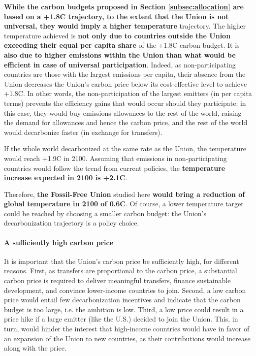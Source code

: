 \documentclass[12pt,english]{article}
\begin{document}
\textbf{While the carbon budgets proposed in Section \ref{subsec:allocation} are based on a +1.8\textdegree{}C trajectory, to the extent that the Union is not universal, they would imply a higher temperature} trajectory. The higher temperature achieved is \textbf{not only due to countries outside the Union exceeding their equal per capita share} of the +1.8\textdegree{}C carbon budget. It is \textbf{also due to higher emissions within the Union than what would be efficient in case of universal participation}. Indeed, as non-participating countries are those with the largest emissions per capita, their absence from the Union decreases the Union's carbon price below its cost-effective level to achieve +1.8\textdegree{}C. In other words, the non-participation of the largest emitters (in per capita terms) prevents the efficiency gains that would occur should they participate: in this case, they would buy emissions allowances to the rest of the world, raising the demand for allowances and hence the carbon price, and the rest of the world would decarbonize faster (in exchange for transfers). 

If the whole world decarbonized at the same rate as the Union, the temperature would reach +1.9\textdegree{}C in 2100. Assuming that emissions in non-participating countries would follow the trend from current policies, the \textbf{temperature increase expected in 2100 is +2.1\textdegree{}C}. 

Therefore, \textbf{the Fossil-Free Union} studied here \textbf{would bring a reduction of global temperature in 2100 of 0.6\textdegree{}C}. Of course, a lower temperature target could be reached by choosing a smaller carbon budget: the Union's decarbonization trajectory is a policy choice. %

\paragraph{A sufficiently high carbon price}
It is important that the Union's carbon price be sufficiently high, for different reasons. First, as transfers are proportional to the carbon price, a substantial carbon price is required to deliver meaningful transfers, finance sustainable development, and convince lower-income countries to join. Second, a low carbon price would entail few decarbonization incentives and indicate that the carbon budget is too large, i.e. the ambition is low. Third, a low price could result in a price hike if a large emitter (like the U.S.) decided to join the Union. This, in turn, would hinder the interest that high-income countries would have in favor of an expansion of the Union to new countries, as their contributions would increase along with the price.
\end{document}
